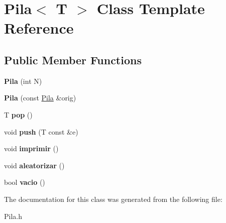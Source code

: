 \hypertarget{class_pila}{}\section{Pila$<$ T $>$ Class Template Reference}
\label{class_pila}
\subsection*{Public Member Functions}
\begin{DoxyCompactItemize}
\item 
\hypertarget{class_pila_a97d428515745369086aecf513990fa24}{}\label{class_pila_a97d428515745369086aecf513990fa24} 
{\bfseries Pila} (int N)
\item 
\hypertarget{class_pila_a88e3da02e61f188d098f77875c221666}{}\label{class_pila_a88e3da02e61f188d098f77875c221666} 
{\bfseries Pila} (const \hyperlink{class_pila}{Pila} \&orig)
\item 
\hypertarget{class_pila_a9250ad4ed594b141d6cdeacc6684ff9a}{}\label{class_pila_a9250ad4ed594b141d6cdeacc6684ff9a} 
T {\bfseries pop} ()
\item 
\hypertarget{class_pila_abec1671867c1881a53fd67a56352e4ba}{}\label{class_pila_abec1671867c1881a53fd67a56352e4ba} 
void {\bfseries push} (T const \&e)
\item 
\hypertarget{class_pila_ad4b5111ccfdb49689ced1af2ba082e52}{}\label{class_pila_ad4b5111ccfdb49689ced1af2ba082e52} 
void {\bfseries imprimir} ()
\item 
\hypertarget{class_pila_a9d5607a089b2ac1b695fe4c251a375fa}{}\label{class_pila_a9d5607a089b2ac1b695fe4c251a375fa} 
void {\bfseries aleatorizar} ()
\item 
\hypertarget{class_pila_a10d685c3878026c0e7ede6c26c193832}{}\label{class_pila_a10d685c3878026c0e7ede6c26c193832} 
bool {\bfseries vacio} ()
\end{DoxyCompactItemize}


The documentation for this class was generated from the following file\+:\begin{DoxyCompactItemize}
\item 
Pila.\+h\end{DoxyCompactItemize}
